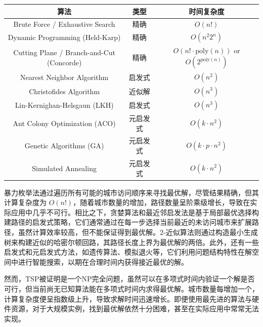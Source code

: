 \documentclass[UTF8,openany,zihao=5]{ctexbook}
\begin{document}
\begin{table}[H]
  \centering
  \label{tab:tsp_methods}
  \begin{tabular}{ccc}
    \toprule
    \textbf{算法} & \textbf{类型} & \textbf{时间复杂度} \\
    \midrule
    Brute Force / Exhaustive Search\cite{cormen2022introduction} & 精确 & $O(n!)$ \\
    Dynamic Programming (Held-Karp)\cite{held1962dynamic} & 精确 & $O(n^2 2^n)$ \\
    Cutting Plane / Branch-and-Cut (Concorde)\cite{applegate2006traveling} & 精确 & $O(n! \cdot \text{poly}(n))$ or $O(2^{\text{poly}(n)})$ \\
    Nearest Neighbor Algorithm\cite{cormen2022introduction} & 启发式 & $O(n^2)$ \\
    Christofides Algorithm\cite{christofides2022worst} & 近似解 & $O(n^3)$ \\
    Lin-Kernighan-Helsgaun (LKH)\cite{lin1973effective} & 启发式 & $O(n^3)$ \\
    Ant Colony Optimization (ACO)\cite{dorigo1996ant} & 元启发式 & $O(k \cdot n^2)$ \\
    Genetic Algorithms (GA)\cite{holland1992adaptation} & 元启发式 & $O(k \cdot p \cdot n^2)$ \\
    Simulated Annealing\cite{kirkpatrick1983optimization} & 元启发式 & $O(k \cdot n^2)$ \\
    \bottomrule
  \end{tabular}
\end{table}

暴力枚举法通过遍历所有可能的城市访问顺序来寻找最优解，尽管结果精确，但其计算复杂度为 $O(n!)$，随着城市数量的增加，路径数量呈阶乘级增长，导致在实际应用中几乎不可行\cite{cormen2022introduction}。相比之下，贪婪算法和最近邻启发法\cite{cormen2022introduction}是基于局部最优选择构建路径的启发式策略，它们通常通过在每一步选择当前最近的未访问城市来扩展路径，虽然计算效率较高，但不能保证得到最优解。2-近似算法\cite{christofides2022worst}则通过构造最小生成树来构建近似的哈密尔顿回路，其路径长度上界为最优解的两倍。此外，还有一些启发式和元启发式方法，如遗传算法\cite{holland1992adaptation}、模拟退火\cite{kirkpatrick1983optimization}等，它们利用问题结构特性在解空间中进行智能搜索，以期在合理时间内获得接近最优的解。

然而，TSP被证明是一个NP完全问题，虽然可以在多项式时间内验证一个解是否可行，但当前尚无已知算法能在多项式时间内求得最优解。城市数量每增加一个，计算复杂度便呈指数级上升，导致求解时间迅速增长。即便使用最先进的算法与硬件资源，对于大规模实例，找到最优解依然十分困难，甚至在实际应用中常常无法实现。
\end{document}
